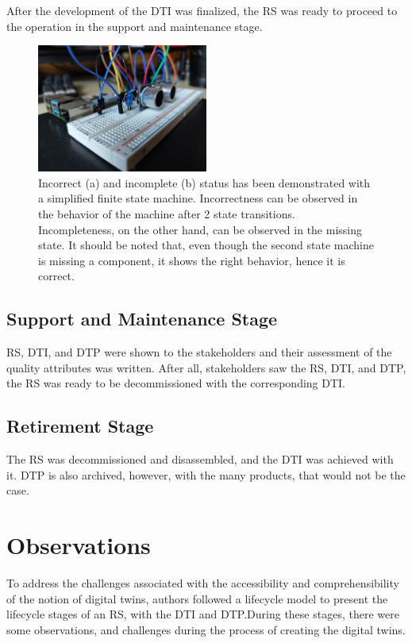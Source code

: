\documentclass[conference]{IEEEtran}
\begin{document}
    After the development of the DTI was finalized, the RS was ready to proceed to the operation in the support and maintenance stage.

    \begin{figure}[htbp]
        \centering
        \includegraphics[width=0.5\textwidth]{Assembled.jpg}
        \caption{Incorrect (a) and incomplete (b) status has been demonstrated with a simplified finite state machine. Incorrectness can be observed in the behavior 
        of the machine after 2 state transitions. Incompleteness, on the other hand, can be observed in the missing state. It should be noted that, even though the second state machine is missing a 
        component, it shows the right behavior, hence it is correct.}\label{fig:Assembled}
    \end{figure}

    \subsection{Support and Maintenance Stage}
    RS, DTI, and DTP were shown to the stakeholders and their assessment of the quality attributes was written. After all, stakeholders saw the RS, DTI, and DTP, the RS was ready to be decommissioned with the corresponding DTI.
    
    \subsection{Retirement Stage}
    The RS was decommissioned and disassembled, and the DTI was achieved with it. DTP is also archived, however, with the many products, that would not be the case.

    \section{Observations} 
    To address the challenges associated with the accessibility and comprehensibility of the notion of digital twins, authors followed a lifecycle model to present the lifecycle stages of an RS, with the DTI and DTP.During these stages, there were some observations, and challenges during the process of creating the digital twins. 
    
\end{document}
